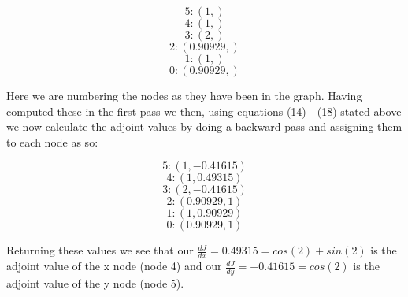 \documentclass{article}
\begin{document}
\begin{equation*}
    5: (1, ) 
\end{equation*}
\begin{equation*}
    4: (1, )
\end{equation*}
\begin{equation*}
    3: (2, )
\end{equation*}
\begin{equation*}
    2: (0.90929, )
\end{equation*}
\begin{equation*}
    1: (1, )
\end{equation*}
\begin{equation*}
    0: (0.90929, )
\end{equation*}

Here we are numbering the nodes as they have been in the graph. Having computed these in the first pass we then, using equations (14) - (18) stated above we now calculate the adjoint values by doing a backward pass and assigning them to each node as so:

\begin{equation*}
    5: (1, -0.41615)
\end{equation*}
\begin{equation*}
    4: (1, 0.49315)
\end{equation*}
\begin{equation*}
    3: (2, -0.41615)
\end{equation*}
\begin{equation*}
    2: (0.90929, 1)
\end{equation*}
\begin{equation*}
    1: (1, 0.90929)
\end{equation*}
\begin{equation*}
    0: (0.90929, 1)
\end{equation*}

Returning these values we see that our $\frac{dJ}{dx} = 0.49315 = cos(2) + sin(2)$ is the adjoint value of the x node (node 4) and our $\frac{dJ}{dy} = -0.41615 = cos(2)$ is the adjoint value of the y node (node 5).
\end{document}
